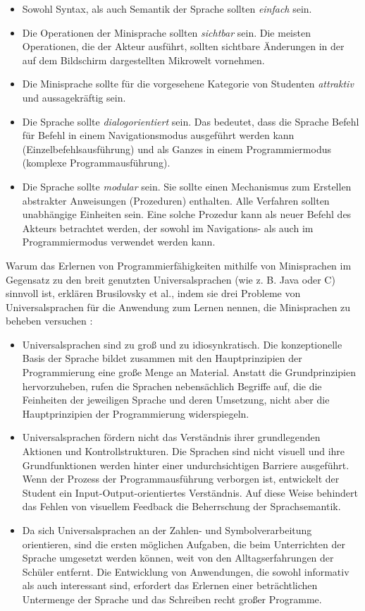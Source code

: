 \begin{itemize}
    \item Sowohl Syntax, als auch Semantik der Sprache sollten \emph{einfach} sein.
    \item Die Operationen der Minisprache sollten \emph{sichtbar} sein. Die meisten Operationen, die der Akteur ausführt, sollten sichtbare Änderungen in der auf dem Bildschirm dargestellten Mikrowelt vornehmen.
    \item Die Minisprache sollte für die vorgesehene Kategorie von Studenten \emph{attraktiv} und aussagekräftig sein.
    \item Die Sprache sollte \emph{dialogorientiert} sein. Das bedeutet, dass die Sprache Befehl für Befehl in einem Navigationsmodus ausgeführt werden kann (Einzelbefehlsausführung) und als Ganzes in einem Programmiermodus (komplexe Programmausführung).
    \item Die Sprache sollte \emph{modular} sein. Sie sollte einen Mechanismus zum Erstellen abstrakter Anweisungen (Prozeduren) enthalten. Alle Verfahren sollten unabhängige Einheiten sein. Eine solche Prozedur kann als neuer Befehl des Akteurs betrachtet werden, der sowohl im Navigations- als auch im Programmiermodus verwendet werden kann.
\end{itemize}

Warum das Erlernen von Programmierfähigkeiten mithilfe von Minisprachen im Gegensatz zu den breit genutzten Universalsprachen (wie z. B. Java oder C) sinnvoll ist, erklären Brusilovsky et al., indem sie drei Probleme von Universalsprachen für die Anwendung zum Lernen nennen, die Minisprachen zu beheben versuchen \cite[67]{brusilovsky1997}:

\begin{itemize}
    \item Universalsprachen sind zu groß und zu idiosynkratisch. Die konzeptionelle Basis der Sprache bildet zusammen mit den Hauptprinzipien der Programmierung eine große Menge an Material. Anstatt die Grundprinzipien hervorzuheben, rufen die Sprachen nebensächlich Begriffe auf, die die Feinheiten der jeweiligen Sprache und deren Umsetzung, nicht aber die Hauptprinzipien der Programmierung widerspiegeln.
    \item Universalsprachen fördern nicht das Verständnis ihrer grundlegenden Aktionen und Kontrollstrukturen. Die Sprachen sind nicht visuell und ihre Grundfunktionen werden hinter einer undurchsichtigen Barriere ausgeführt. Wenn der Prozess der Programmausführung verborgen ist, entwickelt der Student ein Input-Output-orientiertes Verständnis. Auf diese Weise behindert das Fehlen von visuellem Feedback die Beherrschung der Sprachsemantik.
    \item Da sich Universalsprachen an der Zahlen- und Symbolverarbeitung orientieren, sind die ersten möglichen Aufgaben, die beim Unterrichten der Sprache umgesetzt werden können, weit von den Alltagserfahrungen der Schüler entfernt. Die Entwicklung von Anwendungen, die sowohl informativ als auch interessant sind, erfordert das Erlernen einer beträchtlichen Untermenge der Sprache und das Schreiben recht großer Programme.
\end{itemize}

